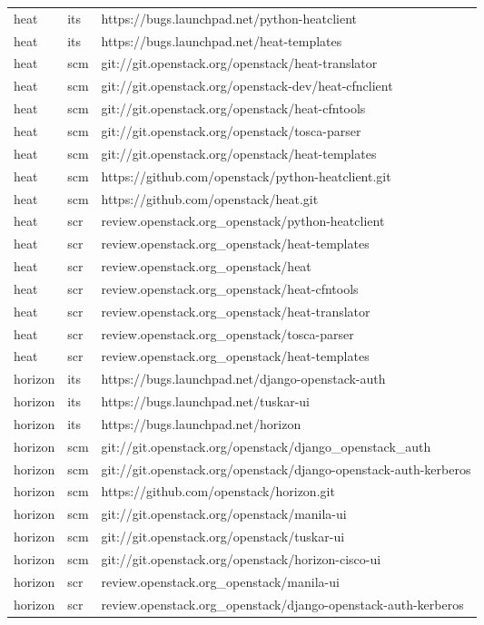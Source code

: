 \begin{center}
\begin{longtable}{|p{4cm}|p{1cm}|p{10cm}|}
heat&its&https://bugs.launchpad.net/python-heatclient\\ 
heat&its&https://bugs.launchpad.net/heat-templates\\ 
heat&scm&git://git.openstack.org/openstack/heat-translator\\ 
heat&scm&git://git.openstack.org/openstack-dev/heat-cfnclient\\ 
heat&scm&git://git.openstack.org/openstack/heat-cfntools\\ 
heat&scm&git://git.openstack.org/openstack/tosca-parser\\ 
heat&scm&git://git.openstack.org/openstack/heat-templates\\ 
heat&scm&https://github.com/openstack/python-heatclient.git\\ 
heat&scm&https://github.com/openstack/heat.git\\ 
heat&scr&review.openstack.org\_openstack/python-heatclient\\ 
heat&scr&review.openstack.org\_openstack/heat-templates\\ 
heat&scr&review.openstack.org\_openstack/heat\\ 
heat&scr&review.openstack.org\_openstack/heat-cfntools\\ 
heat&scr&review.openstack.org\_openstack/heat-translator\\ 
heat&scr&review.openstack.org\_openstack/tosca-parser\\ 
heat&scr&review.openstack.org\_openstack/heat-templates\\ 
horizon&its&https://bugs.launchpad.net/django-openstack-auth\\ 
horizon&its&https://bugs.launchpad.net/tuskar-ui\\ 
horizon&its&https://bugs.launchpad.net/horizon\\ 
horizon&scm&git://git.openstack.org/openstack/django\_openstack\_auth\\ 
horizon&scm&git://git.openstack.org/openstack/django-openstack-auth-kerberos\\ 
horizon&scm&https://github.com/openstack/horizon.git\\ 
horizon&scm&git://git.openstack.org/openstack/manila-ui\\ 
horizon&scm&git://git.openstack.org/openstack/tuskar-ui\\ 
horizon&scm&git://git.openstack.org/openstack/horizon-cisco-ui\\ 
horizon&scr&review.openstack.org\_openstack/manila-ui\\ 
horizon&scr&review.openstack.org\_openstack/django-openstack-auth-kerberos\\ 

\end{longtable}
\end{center}
